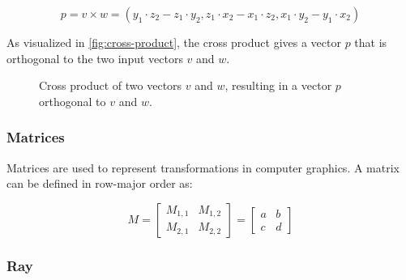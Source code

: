 \begin{equation}
  \label{eqn:cross-product}
  p = v \times w = (y_1 \cdot z_2 - z_1 \cdot y_2, z_1 \cdot x_2 - x_1 \cdot z_2, x_1 \cdot y_2 - y_1 \cdot x_2)
\end{equation}

As visualized in \autoref{fig:cross-product}, the cross product gives a vector $p$ that is orthogonal to the two input vectors $v$ and $w$.

\begin{figure}[H]
  \centering
  \caption{Cross product of two vectors $v$ and $w$, resulting in a vector $p$ orthogonal to $v$ and $w$.}
  \label{fig:cross-product}
\end{figure}

\subsubsection{Matrices}

Matrices are used to represent transformations in computer graphics. A matrix can be defined in row-major order as:

\begin{equation}
  \label{eqn:matrix}
  M = \begin{bmatrix} M_{1,1} & M_{1,2} \\ M_{2,1} & M_{2,2} \end{bmatrix} = \begin{bmatrix} a & b \\ c & d \end{bmatrix}
\end{equation}

\subsubsection{Ray}

